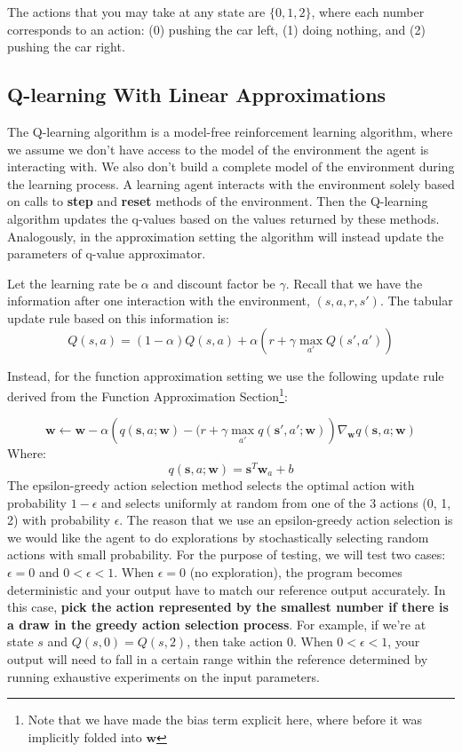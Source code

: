\documentclass[11pt,addpoints,answers]{exam}
\newcommand{\sv}{\mathbf{s}}
\newcommand{\wv}{\mathbf{w}}
\begin{document}
The actions that you may take at any state are $\{0, 1, 2\}$, where each number corresponds to an action: (0) pushing the car left, (1) doing nothing, and (2) pushing the car right.

\subsection{Q-learning With Linear Approximations}
The Q-learning algorithm is a model-free reinforcement learning algorithm, where we assume we don't have access to the model of the environment the agent is interacting with. We also don't build a complete model of the environment during the learning process. A learning agent interacts with the environment solely based on calls to \textbf{step} and \textbf{reset} methods of the environment. Then the Q-learning algorithm updates the q-values based on the values returned by these methods. Analogously, in the approximation setting the algorithm will instead update the parameters of q-value approximator.


Let the learning rate be $\alpha$ and discount factor be $\gamma$. Recall that we have the information after one interaction with the environment, $(s, a, r, s')$. The tabular update rule based on this information is: 
\[
    Q(s,a) = (1 - \alpha) Q(s, a) + \alpha \left(r + \gamma \max_{a'} Q(s', a')\right)
\]

Instead, for the function approximation setting we use the following update rule derived from the Function Approximation Section\footnote{Note that we have made the bias term explicit here, where before it was implicitly folded into $\wv$ }:

\[
\wv \leftarrow \wv - \alpha \left(q(\sv, a; \wv) - (r + \gamma \max_{a'} q(\sv', a'; \wv)\right) \nabla_\wv q(\sv, a; \wv)
\]
Where:
\[
q(\sv,a;\wv) = \sv^T \wv_a + b
\]
The epsilon-greedy action selection method selects the optimal action with probability $1 - \epsilon$ and selects uniformly at random from one of the 3 actions (0, 1, 2) with probability $\epsilon$. The reason that we use an epsilon-greedy action selection is we would like the agent to do explorations by stochastically selecting random actions with small probability. For the purpose of testing, we will test two cases: $\epsilon = 0$ and $0 < \epsilon < 1$. When $\epsilon = 0$ (no exploration), the program becomes deterministic and your output have to match our reference output accurately. In this case, \textbf{pick the action represented by the smallest number if there is a draw in the greedy action selection process}. For example, if we're at state $s$ and $Q(s, 0) = Q(s, 2)$, then take action $0$. When $0 < \epsilon < 1$, your output will need to fall in a certain range within the reference determined by running exhaustive experiments on the input parameters.
\end{document}
